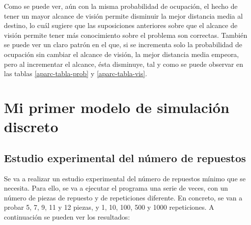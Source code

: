\documentclass[11pt,a4paper]{report}
\begin{document}
Como se puede ver, aún con la misma probabilidad de ocupación, el hecho de tener un mayor alcance de visión permite
disminuir la mejor distancia media al destino, lo cuál sugiere que las suposiciones anteriores sobre que el alcance de
visión permite tener más conocimiento sobre el problema son correctas. También se puede ver un claro patrón en el que,
si se incrementa solo la probabilidad de ocupación sin cambiar el alcance de visión, la mejor distancia media empeora,
pero al incrementar el alcance, ésta disminuye, tal y como se puede observar en las tablas \ref{aparc-tabla-prob} y
\ref{aparc-tabla-vis}.

\newpage

\chapter{Mi primer modelo de simulación discreto}

\section{Estudio experimental del número de repuestos}

Se va a realizar un estudio experimental del número de repuestos mínimo que se necesita. Para ello, se va a ejecutar
el programa una serie de veces, con un número de piezas de repuesto y de repeticiones diferente. En concreto, se van
a probar 5, 7, 9, 11 y 12 piezas, y 1, 10, 100, 500 y 1000 repeticiones. A continuación se pueden ver los resultados:
\end{document}
